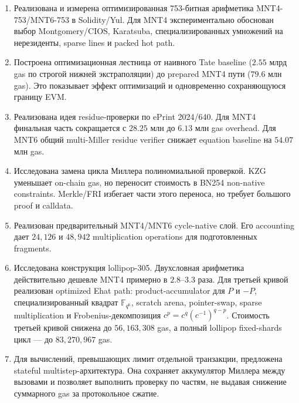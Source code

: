 \documentclass[12pt,a4paper]{article}
\begin{document}
\begin{enumerate}
    \item Реализована и измерена оптимизированная 753-битная арифметика
    MNT4-753/MNT6-753 в Solidity/Yul. Для MNT4 экспериментально обоснован выбор
    Montgomery/CIOS, Karatsuba, специализированных умножений на нерезиденты,
    sparse lines и packed hot path.

    \item Построена оптимизационная лестница от наивного Tate baseline
    ($2.55$ млрд gas по строгой нижней экстраполяции) до prepared MNT4 пути
    ($79.6$ млн gas). Это показывает эффект оптимизаций и одновременно
    сохраняющуюся границу EVM.

    \item Реализована идея residue-проверки по ePrint 2024/640. Для MNT4
    финальная часть сокращается с $28.25$ млн до $6.13$ млн gas overhead.
    Для MNT6 общий multi-Miller residue verifier снижает equation baseline на
    $54.07$ млн gas.

    \item Исследована замена цикла Миллера полиномиальной проверкой. KZG
    уменьшает on-chain gas, но переносит стоимость в BN254 non-native
    constraints. Merkle/FRI избегает части этого переноса, но требует большого
    proof и calldata.

    \item Реализован предварительный MNT4/MNT6 cycle-native слой. Его
    accounting дает $24{,}126$ и $48{,}942$ multiplication operations для
    подготовленных fragments.

    \item Исследована конструкция lollipop-305. Двухсловная арифметика
    действительно дешевле MNT4 примерно в $2.8$--$3.3$ раза. Для третьей
    кривой реализован optimized Ehat path: product-accumulator для $P$ и $-P$,
    специализированный квадрат $\mathbb{F}_{q^6}$, scratch arena,
    pointer-swap, sparse multiplication и Frobenius-декомпозиция
    $c^p=c^q(c^{-1})^{q-p}$. Стоимость третьей кривой снижена до
    $56{,}163{,}308$ gas, а полный lollipop fixed-shards цикл --- до
    $83{,}270{,}967$ gas.

    \item Для вычислений, превышающих лимит отдельной транзакции, предложена
    stateful multistep-архитектура. Она сохраняет аккумулятор Миллера между
    вызовами и позволяет выполнить проверку по частям, не выдавая снижение
    суммарного gas за протокольное сжатие.
\end{enumerate}
\end{document}
